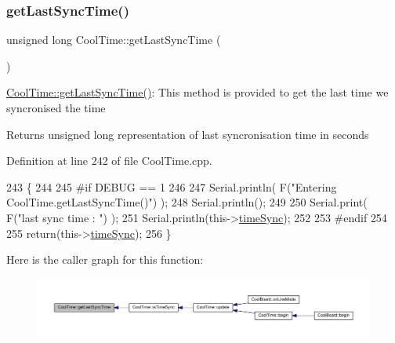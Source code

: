 \mbox{\label{class_cool_time_a5d17f707a9d337720493b2bce9d41c21}} 
\subsubsection{\texorpdfstring{get\+Last\+Sync\+Time()}{getLastSyncTime()}}
{\footnotesize\ttfamily unsigned long Cool\+Time\+::get\+Last\+Sync\+Time (\begin{DoxyParamCaption}{ }\end{DoxyParamCaption})}

\hyperlink{class_cool_time_a5d17f707a9d337720493b2bce9d41c21}{Cool\+Time\+::get\+Last\+Sync\+Time()}\+: This method is provided to get the last time we syncronised the time

\begin{DoxyReturn}{Returns}
unsigned long representation of last syncronisation time in seconds 
\end{DoxyReturn}


Definition at line 242 of file Cool\+Time.\+cpp.


\begin{DoxyCode}
243 \{
244 
245 \textcolor{preprocessor}{#if DEBUG == 1 }
246 
247     Serial.println( F(\textcolor{stringliteral}{"Entering CoolTime.getLastSyncTime()"}) );
248     Serial.println();
249     
250     Serial.print( F(\textcolor{stringliteral}{"last sync time : "}) );
251     Serial.println(this->\hyperlink{class_cool_time_a9d032e76c3470a15b3bbbc52af6463f7}{timeSync});
252 
253 \textcolor{preprocessor}{#endif }
254 
255     \textcolor{keywordflow}{return}(this->\hyperlink{class_cool_time_a9d032e76c3470a15b3bbbc52af6463f7}{timeSync});
256 \}
\end{DoxyCode}
Here is the caller graph for this function\+:\nopagebreak
\begin{figure}[H]
\begin{center}
\leavevmode
\includegraphics[width=350pt]{d6/d49/class_cool_time_a5d17f707a9d337720493b2bce9d41c21_icgraph}
\end{center}
\end{figure}
\mbox{\label{class_cool_time_a41fbbbfd651c2079f54d4b2911e4c705}} 
